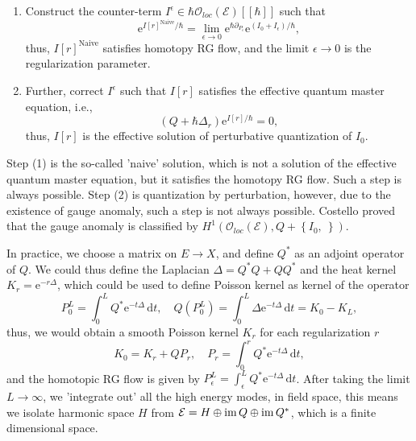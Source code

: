 \documentclass[10pt]{article}
\begin{document}
\begin{proposition}
  \begin{enumerate}[(1)]
    \item Construct the counter-term $ I^{\epsilon} \in \hbar \mathcal{O}_{loc}(\mathcal{E})[[\hbar]]$ such that
      \begin{equation*}
        \mathrm{e}^{I[r]^{\text{Naive}} / \hbar} = \lim_{\epsilon \to 0} \mathrm{e}^{\hbar \partial_{P_{\epsilon}}} \mathrm{e}^{(I_0 + I_{\epsilon})/ \hbar},
      \end{equation*}
      thus, $ I[r]^{\text{Naive}}$ satisfies homotopy RG flow, and the limit $ \epsilon \to 0$ is the regularization parameter.
    \item Further, correct $ I^{\epsilon}$  such that $ I[r]$ satisfies the effective quantum master equation, i.e.,
      \begin{equation*}
        (Q + \hbar \Delta_r) \mathrm{e}^{I[r] / \hbar} = 0,
      \end{equation*}
      thus, $ I[r]$ is the effective solution of perturbative quantization of $ I_0$.
  \end{enumerate}
  Step (1) is the so-called 'naive' solution, which is not a solution of the effective quantum master equation, but it satisfies the homotopy RG flow. Such a step is always possible.
  Step (2) is quantization by perturbation, however, due to the existence of gauge anomaly, such a step is not always possible. Costello proved that the gauge anomaly is classified by $ H^{1}(\mathcal{O}_{loc}(\mathcal{E}), Q + \left\{ I_0, ~ \right\})$.
\end{proposition}

In practice, we choose a matrix on $ E \rightarrow X$, and define $ Q^{*}$ as an adjoint operator of $ Q$. We could thus define the Laplacian $ \Delta = Q^{*}Q + Q Q^{*}$ and the heat kernel $ K_r = \mathrm{e}^{-r \Delta}$, which could be used to define Poisson kernel as kernel of the operator
\begin{equation*}
  P^{L}_{0} = \int _{0}^{L} Q^{*} \mathrm{e}^{- t \Delta} \, \mathrm{d} t, \quad Q \left( P^{L}_{0} \right) = \int _{0}^{L} \Delta \mathrm{e}^{- t \Delta} \, \mathrm{d} t = K_0 - K_L,
\end{equation*}
thus, we would obtain a smooth Poisson kernel $ K_r$ for each regularization $ r$
\begin{equation*}
  K_0 = K_r + Q P_r, \quad P_r = \int _{0}^{r} Q^{*} \mathrm{e}^{- t \Delta} \, \mathrm{d} t,
\end{equation*}
and the homotopic RG flow is given by $ P_{\epsilon}^{L} = \int _{\epsilon}^{L} Q^{*} \mathrm{e}^{- t \Delta} \, \mathrm{d} t$.
After taking the limit $ L \to \infty$, we 'integrate out' all the high energy modes, in field space, this means we isolate harmonic space $ H$ from $ \mathcal{E} = H \oplus \operatorname{im} Q \oplus \operatorname{im} Q^{*}$, which is a finite dimensional space.
\end{document}
